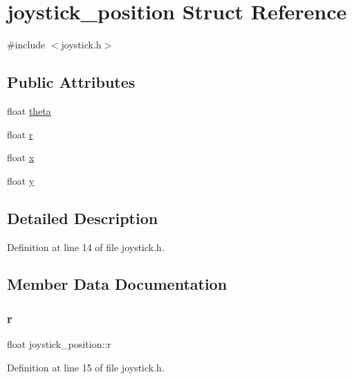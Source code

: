\hypertarget{structjoystick__position}{}\section{joystick\+\_\+position Struct Reference}
\label{structjoystick__position}


{\ttfamily \#include $<$joystick.\+h$>$}

\subsection*{Public Attributes}
\begin{DoxyCompactItemize}
\item 
float \hyperlink{structjoystick__position_ad738e8acb3656438c10d2ec7670639e5}{theta}
\item 
float \hyperlink{structjoystick__position_a0a9043868a14fce25888dd81b80f6c94}{r}
\item 
float \hyperlink{structjoystick__position_a71c3292c1be3c3400a388eac41a47ad3}{x}
\item 
float \hyperlink{structjoystick__position_ad8fc27fbd5404a4f8cdc1a045a0d689a}{y}
\end{DoxyCompactItemize}


\subsection{Detailed Description}


Definition at line 14 of file joystick.\+h.



\subsection{Member Data Documentation}
\mbox{\label{structjoystick__position_a0a9043868a14fce25888dd81b80f6c94}} 
\subsubsection{\texorpdfstring{r}{r}}
{\footnotesize\ttfamily float joystick\+\_\+position\+::r}



Definition at line 15 of file joystick.\+h.

\mbox{\label{structjoystick__position_ad738e8acb3656438c10d2ec7670639e5}} 
